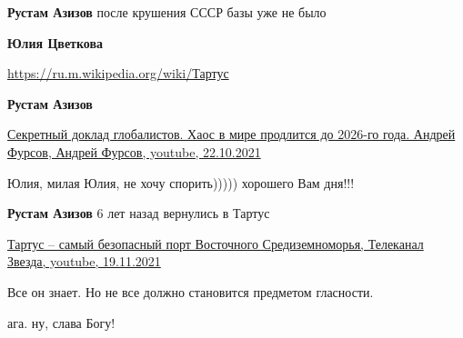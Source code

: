 \begin{itemize}
\begin{itemize}
\textbf{Рустам Азизов} после крушения СССР базы уже не было

\textbf{Юлия Цветкова}

\url{https://ru.m.wikipedia.org/wiki/Тартус}

\textbf{Рустам Азизов} 

\href{https://youtu.be/vnW6xF8MDc8}{%
Секретный доклад глобалистов. Хаос в мире продлится до 2026-го года. Андрей Фурсов, %
Андрей Фурсов, youtube, 22.10.2021%
}

Юлия, милая Юлия, не хочу спорить))))) хорошего Вам дня!!!

\textbf{Рустам Азизов} 6 лет назад вернулись в Тартус 

\href{https://youtu.be/tt4M_6Rc654}{%
Тартус – самый безопасный порт Восточного Средиземноморья, Телеканал Звезда, youtube, 19.11.2021%
}

\end{itemize} %


Все он знает. Но не все должно становится предметом гласности.

\begin{itemize} %
ага. ну, слава Богу!
\end{itemize} %

\end{itemize} %

